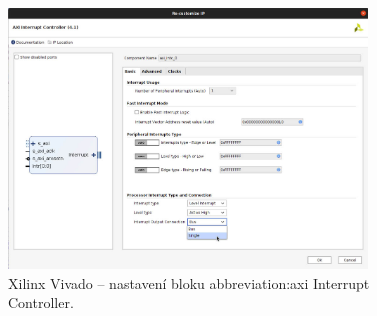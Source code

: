 \documentclass[a4paper, twoside, 11pt]{article}
\begin{document}
				\begin{figure}[htbp!]
					\centering
					\includegraphics[width=0.85\textwidth]{src/png/kr26-xilinx-vivado-flow/kr26-xilix-vivado-flow-10.jpg}
					\caption{Xilinx Vivado – nastavení bloku \gls{abbreviation:axi} Interrupt Controller.}
					\label{fig:kr26-xilix-vivado-flow-10}
				\end{figure}
\end{document}
